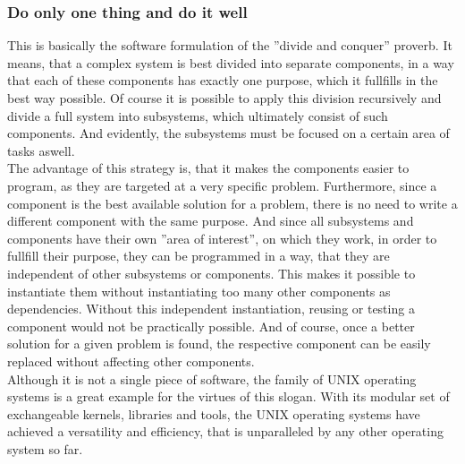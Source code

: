 		\subsubsection{Do only one thing and do it well}
			This is basically the software formulation of the ''divide and conquer'' proverb.
			It means, that a complex system is best divided into separate components, in a way that each of these components has exactly one purpose, which it fullfills in the best way possible.
			Of course it is possible to apply this division recursively and divide a full system into subsystems, which ultimately consist of such components.
			And evidently, the subsystems must be focused on a certain area of tasks aswell.\\
			The advantage of this strategy is, that it makes the components easier to program, as they are targeted at a very specific problem.
			Furthermore, since a component is the best available solution for a problem, there is no need to write a different component with the same purpose.
			And since all subsystems and components have their own ''area of interest'', on which they work, in order to fullfill their purpose, they can be programmed in a way, that they are independent of other subsystems or components.
			This makes it possible to instantiate them without instantiating too many other components as dependencies.
			Without this independent instantiation, reusing or testing a component would not be practically possible.
			And of course, once a better solution for a given problem is found, the respective component can be easily replaced without affecting other components.\\
			Although it is not a single piece of software, the family of UNIX operating systems is a great example for the virtues of this slogan.
			With its modular set of exchangeable kernels, libraries and tools, the UNIX operating systems have achieved a versatility and efficiency, that is unparalleled by any other operating system so far.

